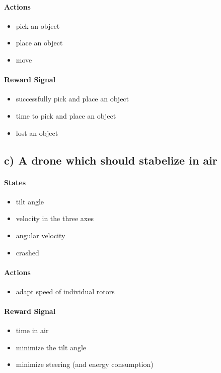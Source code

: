 \documentclass{article}
\begin{document}
\paragraph*{Actions}
\begin{itemize}
    \item pick an object
    \item place an object
    \item move
\end{itemize}


\paragraph*{Reward Signal}
\begin{itemize}
    \item successfully pick and place an object
    \item time to pick and place an object
    \item lost an object
\end{itemize}




\subsection*{c) A drone which should stabelize in air}

\paragraph*{States}
\begin{itemize}
    \item tilt angle
    \item velocity in the three axes
    \item angular velocity
    \item crashed
\end{itemize}

\paragraph*{Actions}
\begin{itemize}
    \item adapt speed of individual rotors
\end{itemize}

\paragraph*{Reward Signal}
\begin{itemize}
    \item time in air
    \item minimize the tilt angle
    \item minimize steering (and energy consumption)
\end{itemize}
\end{document}
